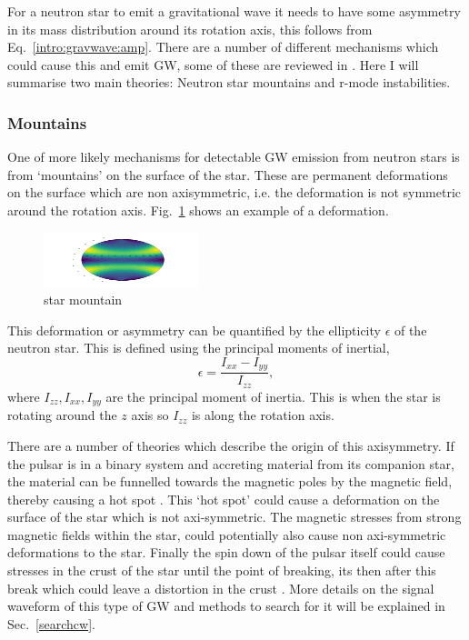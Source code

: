 For a neutron star to emit a gravitational wave it needs to have some asymmetry in its mass distribution around its rotation axis, this follows from Eq.~\ref{intro:gravwave:amp}. 
There are a number of different mechanisms which could cause this and emit \ac{GW}, some of these are reviewed in \citep{glampedakis2017GravitationalWaves,riles2017RecentSearches,haskell2015DetectingGravitational,lasky2015GravitationalWaves}.
Here I will summarise two main theories: Neutron star mountains and r-mode instabilities.


\subsubsection{Mountains}

One of more likely mechanisms for detectable \ac{GW} emission from neutron stars is from `mountains' on the surface of the star.
These are permanent deformations on the surface which are non axisymmetric, i.e. the deformation is not symmetric around the rotation axis.
Fig.~\ref{intro:source:cw:mountain} shows an example of a deformation.
\begin{figure}[h]
	\centering
	\includegraphics[width=\textwidth]{testimg.png}
	\caption{star mountain}
	\label{intro:source:cw:mountain}
\end{figure}

This deformation or asymmetry can be quantified by the ellipticity $\epsilon$ of the neutron star.
This is defined using the principal moments of inertial,
\begin{equation}
\label{ellipticity}
\epsilon = \frac{I_{xx}-I_{yy}}{I_{zz}},
\end{equation}
where $I_{zz},I_{xx},I_{yy}$ are the principal moment of inertia.
This is when the star is rotating around the $z$ axis so $I_{zz}$ is along the rotation axis. 

There are a number of theories which describe the origin of this axisymmetry.
If the pulsar is in a binary system and accreting material from its companion star, the material can be funnelled towards the magnetic poles by the magnetic field, thereby causing a hot spot \citep{haskell2015DetectingGravitational}.
This `hot spot' could cause a deformation on the surface of the star which is not axi-symmetric. 
The magnetic stresses from strong magnetic fields within the star, could potentially also cause non axi-symmetric deformations to the star.
Finally the spin down of the pulsar itself could cause stresses in the crust of the star until the point of breaking, its then after this break which could leave a distortion in the crust \citep{becker2009NeutronStars}.
More details on the signal waveform of this type of \ac{GW} and methods to search for it will be explained in Sec.~\ref{searchcw}.
 
